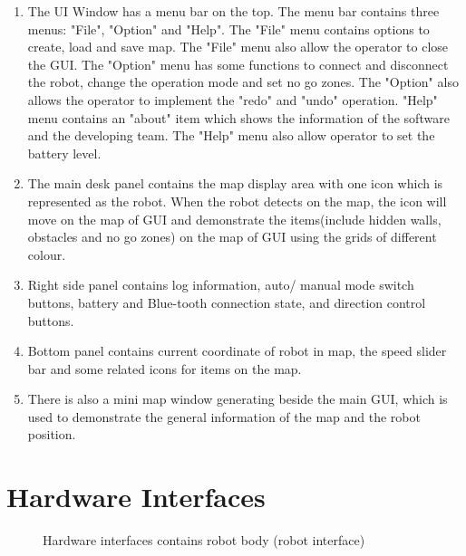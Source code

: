 \documentclass[11pt, a4paper]{report}
\begin{document}
\begin{enumerate}
\item The UI Window has a menu bar on the top. The menu bar contains three menus: "File", "Option" and "Help". The "File" menu contains options to create, load and save map. The "File" menu also allow the operator to close the GUI. The "Option" menu has some functions to connect and disconnect the robot, change the operation mode and set no go zones. The "Option" also allows the operator to implement the "redo" and "undo" operation. "Help" menu contains an "about" item which shows the information of the software and the developing team. The "Help" menu also allow operator to set the battery level. 
\item The main desk panel contains the map display area with one icon which is represented as the robot. When the robot detects on the map, the icon will move on the map of GUI and demonstrate the items(include hidden walls, obstacles and no go zones) on the map of GUI using the grids of different colour.
\item Right side panel contains log information, auto/ manual mode switch buttons, battery and Blue-tooth connection state, and direction control buttons. 
\item Bottom panel contains current coordinate of robot in map, the speed slider bar and some related icons for items on the map. 
\item There is also a mini map window generating beside the main GUI, which is used to demonstrate the general information of the map and the robot position. 
\end{enumerate}

\pagebreak

\section{Hardware Interfaces}


\begin{figure}[ht]
\centering
\setlength\fboxsep{2pt}
\setlength\fboxrule{0.2pt}
\caption{Hardware interfaces contains robot body (robot interface)}
\label{sec:GUI}
\label{fig:GUI}
\end{figure}
\end{document}
